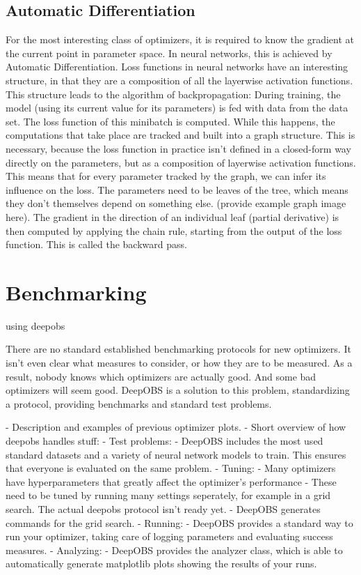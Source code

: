 \documentclass[twoside,12pt,a4paper]{report}
\begin{document}
\subsection{Automatic Differentiation}
For the most interesting class of optimizers, it is required to know the gradient at the current point in parameter space. In neural networks, this is achieved by Automatic Differentiation.
Loss functions in neural networks have an interesting structure, in that they are a composition of all the layerwise activation functions. This structure leads to the algorithm of backpropagation:
During training, the model (using its current value for its parameters) is fed with data from the data set. The loss function of this minibatch is computed. While this happens, the computations that take place are tracked and built into a graph structure. This is necessary, because the loss function in practice isn't defined in a closed-form way directly on the parameters, but as a composition of layerwise activation functions. This means that for every parameter tracked by the graph, we can infer its influence on the loss. The parameters need to be leaves of the tree, which means they don't themselves depend on something else. (provide example graph image here).
The gradient in the direction of an individual leaf (partial derivative) is then computed by applying the chain rule, starting from the output of the loss function. This is called the backward pass.





\section{Benchmarking}
using deepobs \cite{deepobs}
\begin{markdown}
There are no standard established benchmarking protocols for new optimizers. It isn't even clear what measures to consider, or how they are to be measured. As a result, nobody knows which optimizers are actually good. And some bad optimizers will seem good.
DeepOBS is a solution to this problem, standardizing a protocol, providing benchmarks and standard test problems.

- Description and examples of previous optimizer plots.
- Short overview of how deepobs handles stuff:
    - Test problems:
      	- DeepOBS includes the most used standard datasets and a variety of neural network models to train. This ensures that everyone is evaluated on the same problem.
    - Tuning:
    	- Many optimizers have hyperparameters that greatly affect the optimizer's performance
 	    - These need to be tuned by running many settings seperately, for example in a grid search. The actual deepobs protocol isn't ready yet.
      - DeepOBS generates commands for the grid search.
    - Running:
      	- DeepOBS provides a standard way to run your optimizer, taking care of logging parameters and evaluating success measures.
    - Analyzing:
      	- DeepOBS provides the analyzer class, which is able to automatically generate matplotlib plots showing the results of your runs.
\end{markdown}
\end{document}
